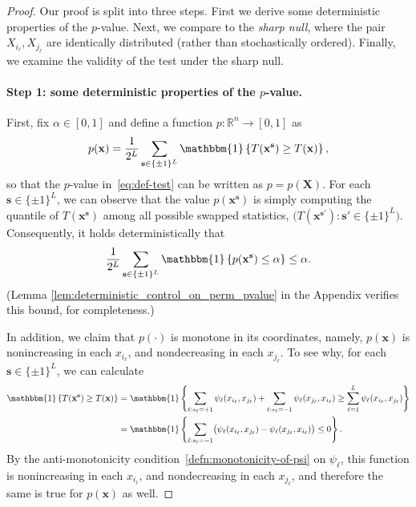 \documentclass[12pt]{article}
\newcommand{\R}{\mathbb{R}}
\newcommand{\One}[1]{{\mathbbm{1}}\left\{{#1}\right\}}
\newcommand{\bs}{\mathbf{s}}
\newcommand{\bx}{\mathbf{x}}
\newcommand{\bX}{\mathbf{X}}
\begin{document}
\begin{proof}
Our proof is split into three steps. First we derive some deterministic properties of the $p$-value. Next, we compare to the \emph{sharp null}, where the pair $X_{i_\ell},X_{j_\ell}$ are identically distributed (rather than stochastically ordered). Finally, we examine the validity of the test under the sharp null.

\paragraph{Step 1: some deterministic properties of the $p$-value.} First, fix $\alpha \in [0,1]$ and define a function $p:\R^n\to[0,1]$ as
\begin{align}\label{eq:pvalue-as-a-function-of-data}
    p(\bx) = \frac{1}{2^L}\sum_{\bs\in\{\pm 1\}^L}\One{T(\bx^{\bs})\geq T(\bx)},
\end{align}
so that the $p$-value in~\eqref{eq:def-test} can be written as
$p = p(\bX)$. For each $\bs\in\{\pm 1\}^L$, we can observe that the value $p(\bx^{\bs})$ is simply computing the quantile of $T(\bx^{\bs})$ among all possible swapped statistics, $\big(T(\bx^{\bs'}) : \bs'\in\{\pm 1\}^L\big)$. Consequently, it holds deterministically that
\begin{equation}\label{eqn:pvalue_deterministic_quantile}\frac{1}{2^L}\sum_{\bs\in\{\pm 1\}^L} \One{p(\bx^{\bs}) \leq \alpha}\leq \alpha.
\end{equation}
(Lemma \ref{lem:deterministic_control_on_perm_pvalue} in the Appendix verifies this bound, for completeness.)

In addition, we claim that $p(\cdot)$ is monotone in its coordinates, namely, $p(\bx)$ is nonincreasing in each $x_{i_\ell}$, and nondecreasing in each $x_{j_\ell}$. To see why, for each $\bs\in\{\pm 1\}^L$, we can calculate
\begin{align*}
    \One{T(\bx^\bs)\geq T(\bx)}
    &=\One{\sum_{\ell : s_\ell = +1} \psi_\ell(x_{i_\ell},x_{j_\ell}) +\sum_{\ell : s_\ell = -1} \psi_\ell(x_{j_\ell},x_{i_\ell}) \geq \sum_{\ell=1}^L \psi_\ell(x_{i_\ell},x_{j_\ell})}\\
    &=\One{\sum_{\ell : s_\ell = -1} \bigl(\psi_\ell(x_{i_\ell},x_{j_\ell}) - \psi_\ell(x_{j_\ell},x_{i_\ell})\bigr) \leq 0}.
\end{align*}
By the anti-monotonicity condition~\eqref{defn:monotonicity-of-psi} on  $\psi_\ell$, this function is nonincreasing in each $x_{i_\ell}$, and nondecreasing in each $x_{j_\ell}$, and therefore the same is true for $p(\bx)$ as well.


\end{proof}
\end{document}
